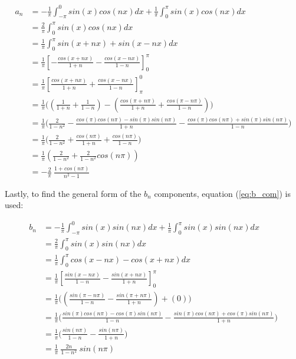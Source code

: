\documentclass{article}
\begin{document}
\begin{align}
    a_{n}   &= -\frac{1}{\pi}\int_{-\pi}^{0}sin(x)cos(nx)dx + \frac{1}{\pi}\int_{0}^{\pi}sin(x)cos(nx)dx\\
            &= \frac{2}{\pi}\int_{0}^{\pi}sin(x)cos(nx)dx\\
            &= \frac{1}{\pi}\int_{0}^{\pi}sin(x+nx)+sin(x-nx)dx\\
            &= \frac{1}{\pi}\left[-\frac{cos(x+nx)}{1+n}-\frac{cos(x-nx)}{1-n}\right]_{0}^{\pi}\\
            &= \frac{1}{\pi}\left[\frac{cos(x+nx)}{1+n}+\frac{cos(x-nx)}{1-n}\right]_{\pi}^{0}\\
            &= \frac{1}{\pi}\Bigg(\left(\frac{1}{1+n}+\frac{1}{1-n}\right) - \left(\frac{cos(\pi+n\pi)}{1+n}+\frac{cos(\pi-n\pi)}{1-n}\right)\Bigg)\\
            &= \frac{1}{\pi}\Bigg(\frac{2}{1-n^{2}}-\frac{cos(\pi)cos(n\pi)-sin(\pi)sin(n\pi)}{1+n}-\frac{cos(\pi)cos(n\pi)+sin(\pi)sin(n\pi)}{1-n}\Bigg)\\
            &= \frac{1}{\pi}\Bigg(\frac{2}{1-n^{2}}+\frac{cos(n\pi)}{1+n}+\frac{cos(n\pi)}{1-n}\Bigg)\\
            &= \frac{1}{\pi}\left(\frac{2}{1-n^{2}}+\frac{2}{1-n^{2}}cos(n\pi)\right)\\
            &= -\frac{2}{\pi} \ \frac{1+cos(n\pi)}{n^{2}-1}
\end{align}

Lastly, to find the general form of the $b_{n}$ components, equation (\ref{eq:b_com}) is used:

\begin{align}
    b_{n}   &= -\frac{1}{\pi}\int_{-\pi}^{0}sin(x)sin(nx)dx + \frac{1}{\pi}\int_{0}^{\pi}sin(x)sin(nx)dx\\
            &= \frac{2}{\pi}\int_{0}^{\pi}sin(x)sin(nx)dx\\
            &= \frac{1}{\pi}\int_{0}^{\pi}cos(x-nx)-cos(x+nx)dx\\
            &= \frac{1}{\pi}\left[\frac{sin(x-nx)}{1-n}-\frac{sin(x+nx)}{1+n}\right]_{0}^{\pi}\\
            &= \frac{1}{\pi}\Bigg(\left(\frac{sin(\pi-n\pi)}{1-n}-\frac{sin(\pi+n\pi)}{1+n}\right)+\left(0\right)\Bigg)\\
            &= \frac{1}{\pi}\Bigg(\frac{sin(\pi)cos(n\pi)-cos(\pi)sin(n\pi)}{1-n}-\frac{sin(\pi)cos(n\pi)+cos(\pi)sin(n\pi)}{1+n}\Bigg)\\
            &= \frac{1}{\pi}\Bigg(\frac{sin(n\pi)}{1-n}-\frac{sin(n\pi)}{1+n}\Bigg)\\
            &= \frac{1}{\pi} \ \frac{2n}{1-n^{2}} \ sin(n\pi)
\end{align}
\end{document}
